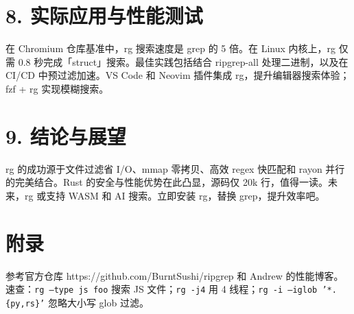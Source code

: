 \chapter{8. 实际应用与性能测试}
在 Chromium 仓库基准中，rg 搜索速度是 grep 的 5 倍。在 Linux 内核上，rg 仅需 0.8 秒完成「struct」搜索。最佳实践包括结合 ripgrep-all 处理二进制，以及在 CI/CD 中预过滤加速。VS Code 和 Neovim 插件集成 rg，提升编辑器搜索体验；fzf + rg 实现模糊搜索。\par
\chapter{9. 结论与展望}
rg 的成功源于文件过滤省 I/O、mmap 零拷贝、高效 regex 快匹配和 rayon 并行的完美结合。Rust 的安全与性能优势在此凸显，源码仅 20k 行，值得一读。未来，rg 或支持 WASM 和 AI 搜索。立即安装 rg，替换 grep，提升效率吧。\par
\chapter{附录}
参考官方仓库 https://github.com/BurntSushi/ripgrep 和 Andrew 的性能博客。速查：\texttt{rg --type js foo} 搜索 JS 文件；\texttt{rg -j4} 用 4 线程；\texttt{rg -i --iglob '*.\{{}py,rs\}{}'} 忽略大小写 glob 过滤。\par
